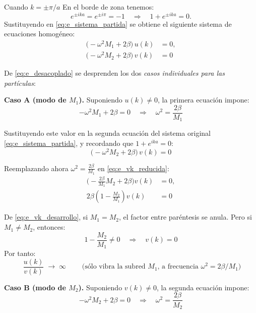 \documentclass{article}
\begin{document}
Cuando \textcolor{vividviolet}{\textbf{\(k=\pm\pi/a\)}}
En el borde de zona tenemos:
\[
e^{\pm ika}=e^{\pm i\pi}=-1
\quad\Rightarrow\quad
1+e^{\pm ika}=0.
\]
Sustituyendo en \eqref{eq:e_sistema_partida} se obtiene el siguiente sistema de ecuaciones homogéneo:
\begin{equation}
\begin{split}
\big(-\omega^{2}M_{1}+2\beta\big)\,u(k) &= 0,\\
\big(-\omega^{2}M_{2}+2\beta\big)\,v(k) &= 0
\end{split}
\label{eq:e_desacoplado}
\end{equation}

De \eqref{eq:e_desacoplado} se desprenden los dos \emph{casos individuales para las partículas}:

 \textbf{Caso A (modo de \(M_{1}\)).}
Suponiendo \(u(k)\neq 0\), la primera ecuación impone:
\begin{equation}
-\omega^{2}M_{1}+2\beta = 0
\quad\Rightarrow\quad
\boxed{\omega^{2}=\frac{2\beta}{M_{1}}}
\label{eq:e_omegaA}
\end{equation}

Sustituyendo este valor en la segunda ecuación del sistema original \eqref{eq:e_sistema_partida}, y recordando que \(1+e^{ika}=0\):
\begin{equation}
\big(-\omega^{2}M_{2}+2\beta\big)\,v(k) = 0
\label{eq:e_vk_reducida}
\end{equation}

Reemplazando ahora \(\omega^{2}=\frac{2\beta}{M_{1}}\) en \eqref{eq:e_vk_reducida}:
\begin{equation}
\begin{split}
\Big(-\frac{2\beta}{M_{1}}M_{2}+2\beta\Big)v(k) &= 0,\\[4pt]
2\beta\left(1-\frac{M_{2}}{M_{1}}\right)v(k) &= 0
\end{split}
\label{eq:e_vk_desarrollo}
\end{equation}

De \eqref{eq:e_vk_desarrollo}, si \(M_{1}=M_{2}\), el factor entre paréntesis se anula.  
Pero si \(M_{1}\neq M_{2}\), entonces:
\[
1-\frac{M_{2}}{M_{1}}\neq 0 \quad\Rightarrow\quad v(k)=0
\]
Por tanto:
\begin{equation}
\boxed{\;\dfrac{u(k)}{v(k)}\;\longrightarrow\;\infty\;}
\qquad\text{(sólo vibra la subred \(M_{1}\), a frecuencia \(\omega^{2}=2\beta/M_{1}\))}
\label{eq:e_razon_infinita}
\end{equation}

\textbf{Caso B (modo de \(M_{2}\)).}
Suponiendo \(v(k)\neq 0\), la segunda ecuación impone:
\begin{equation}
-\omega^{2}M_{2}+2\beta = 0
\quad\Rightarrow\quad
\boxed{\omega^{2}=\frac{2\beta}{M_{2}}}
\label{eq:e_omegaB}
\end{equation}
\end{document}
